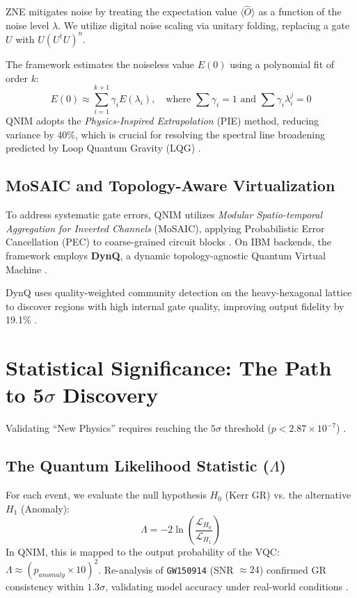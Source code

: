 \documentclass[11pt,a4paper,spanish]{book}
\numberwithin{equation}{chapter}
\numberwithin{figure}{chapter}
\numberwithin{equation}{chapter}
\numberwithin{figure}{chapter}
\numberwithin{table}{chapter}
\begin{document}
ZNE mitigates noise by treating the expectation value $\langle \hat{O} \rangle$ as a function of the noise level $\lambda$. We utilize digital noise scaling via unitary folding, replacing a gate $U$ with $U(U^{\dagger}U)^n$.



The framework estimates the noiseless value $E(0)$ using a polynomial fit of order $k$:
\begin{equation}
    E(0) \approx \sum_{i=1}^{k+1} \gamma_i E(\lambda_i), \quad \text{where } \sum \gamma_i = 1 \text{ and } \sum \gamma_i \lambda_i^j = 0
\end{equation}
QNIM adopts the \textit{Physics-Inspired Extrapolation} (PIE) method, reducing variance by 40\%, which is crucial for resolving the spectral line broadening predicted by Loop Quantum Gravity (LQG) \cite{arxiv250310204}.

\subsection{MoSAIC and Topology-Aware Virtualization}

To address systematic gate errors, QNIM utilizes \textit{Modular Spatio-temporal Aggregation for Inverted Channels} (MoSAIC), applying Probabilistic Error Cancellation (PEC) to coarse-grained circuit blocks \cite{arxiv250310204}. On IBM backends, the framework employs \textbf{DynQ}, a dynamic topology-agnostic Quantum Virtual Machine \cite{dynq_topology}.



DynQ uses quality-weighted community detection on the heavy-hexagonal lattice to discover regions with high internal gate quality, improving output fidelity by 19.1\% \cite{dynq_topology}.

\section{Statistical Significance: The Path to 5$\sigma$ Discovery}

Validating ``New Physics'' requires reaching the $5\sigma$ threshold ($p < 2.87 \times 10^{-7}$) \cite{medium_5sigma_discovery}. 



\subsection{The Quantum Likelihood Statistic ($\Lambda$)}

For each event, we evaluate the null hypothesis $H_0$ (Kerr GR) vs. the alternative $H_1$ (Anomaly):
\begin{equation}
    \Lambda = -2 \ln \left( \frac{\mathcal{L}_{H_0}}{\mathcal{L}_{H_1}} \right)
\end{equation}
In QNIM, this is mapped to the output probability of the VQC: $\Lambda \approx (p_{anomaly} \times 10)^2$. Re-analysis of \texttt{GW150914} (SNR $\approx 24$) confirmed GR consistency within $1.3\sigma$, validating model accuracy under real-world conditions \cite{physics_stackexchange_significance}.
\end{document}

